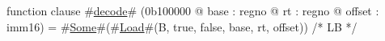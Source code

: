 function clause #\hyperref[zdecode]{decode}# (0b100000 @ base : regno @ rt : regno @ offset : imm16) =
  #\hyperref[zSome]{Some}#(#\hyperref[zLoad]{Load}#(B, true,  false, base, rt, offset)) /* LB */
